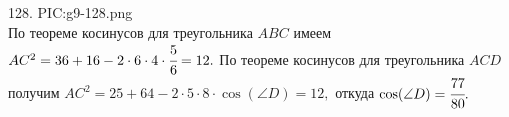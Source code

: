 128. {{PIC:g9-128.png}}\\
По теореме косинусов для треугольника $ABC$ имеем $AC^2=36+16-2\cdot6\cdot4\cdot\cfrac{5}{6}=12.$ По теореме косинусов для треугольника $ACD$ получим $AC^2=25+64-2\cdot5\cdot8\cdot \cos(\angle D)=12,$ откуда $\cos(\angle D)=\cfrac{77}{80}.$\newpage\noindent
